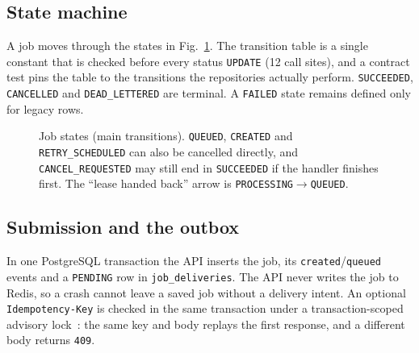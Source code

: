 \documentclass[conference]{IEEEtran}
\newcommand{\code}[1]{\texttt{\small #1}}
\begin{document}
\subsection{State machine}
A job moves through the states in Fig.~\ref{fig:states}. The transition table is a single constant that is checked before every status \code{UPDATE} (12 call sites), and a contract test pins the table to the transitions the repositories actually perform. \code{SUCCEEDED}, \code{CANCELLED} and \code{DEAD\_LETTERED} are terminal. A \code{FAILED} state remains defined only for legacy rows.

\begin{figure}[t]
\centering
{}
\caption{Job states (main transitions). \code{QUEUED}, \code{CREATED} and \code{RETRY\_SCHEDULED} can also be cancelled directly, and \code{CANCEL\_REQUESTED} may still end in \code{SUCCEEDED} if the handler finishes first. The ``lease handed back'' arrow is \code{PROCESSING}$\rightarrow$\code{QUEUED}.}
\label{fig:states}
\end{figure}

\subsection{Submission and the outbox}
In one PostgreSQL transaction the API inserts the job, its \code{created}/\code{queued} events and a \code{PENDING} row in \code{job\_deliveries}. The API never writes the job to Redis, so a crash cannot leave a saved job without a delivery intent. An optional \code{Idempotency-Key} is checked in the same transaction under a transaction-scoped advisory lock~\cite{pglocking}: the same key and body replays the first response, and a different body returns \code{409}.
\end{document}
